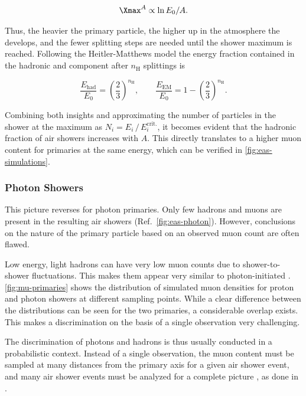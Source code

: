 \begin{equation}
\label{eq:superposition-model}
\Xmax^A \propto \ln E_0/A.
\end{equation}

Thus, the heavier the primary particle, the higher up in the atmosphere the 
\EAS develops, and the fewer splitting steps are needed until the shower 
maximum is reached. Following the Heitler-Matthews model the energy fraction 
contained in the hadronic and \EM component after $n_\mathrm{H}$ splittings is

\begin{equation}
	\label{eq:component-energy}
	\frac{E_\mathrm{had}}{E_0} = \left(\frac{2}{3}\right)^{n_\mathrm{H}},
	\qquad
	\frac{E_\mathrm{EM}}{E_0} = 1 -\left(\frac{2}{3}\right)^{n_\mathrm{H}}.
\end{equation}

Combining both insights and approximating the number of particles in the shower
at the maximum as $N_i = E_i\,/\,E^\mathrm{crit.}_i$, it becomes evident that
the hadronic fraction of air showers increases with $A$. This directly 
translates to a higher muon content for primaries at the same energy, which can
be verified in \cref{fig:eas-simulations}.

\subsubsection{Photon Showers}
\label{sssec:photon-showers}

This picture reverses for photon primaries. Only few hadrons and muons are 
present in the resulting air showers (Ref.\ \cref{fig:eas-photon}). However,
conclusions on the nature of the primary particle based on an observed muon
count are often flawed. 

Low energy, light hadrons can have very low muon counts due to 
shower-to-shower fluctuations. This makes them appear very similar to 
photon-initiated \EASs. \cref{fig:mu-primaries} shows the distribution of 
simulated muon densities for proton and photon showers at different sampling 
points. While a clear difference between the distributions can be seen for the 
two primaries, a considerable overlap exists. This makes a discrimination on 
the basis of a single observation very challenging. 

The discrimination of photons and hadrons is thus usually conducted in a 
probabilistic context. Instead of a single observation, the muon content must
be sampled at many distances from the primary axis for a given air shower 
event, and many air shower events must be analyzed for a complete picture
\cite{gonzalezSearchesPrimaryPhotons2025}, as done in .

